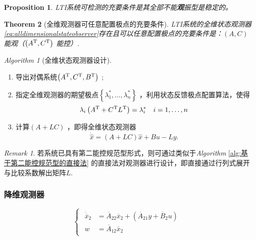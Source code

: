 \documentclass[14pt,a4paper]{article}
\theoremstyle{plain}
\newtheorem{thm}{Theorem}[section]
\theoremstyle{definition}
\theoremstyle{remark}
\newtheorem*{nnr}{Remark}
\theoremstyle{plain}
\theoremstyle{plain}
\theoremstyle{plain}
\newtheorem{prop}[thm]{Proposition}
\theoremstyle{definition}
\theoremstyle{remark}
\newtheorem{alg}{Algorithm}[section]
\numberwithin{equation}{section}
\begin{document}
				\begin{prop}  
				\label{prop:可检测性与可稳性的关系2}
					LTI系统可检测的充要条件是其全部不能\textbf{观}振型是稳定的。
				\end{prop} 

				\begin{thm}[全维观测器可任意配置极点的充要条件]  
				\label{the:全维观测器可任意配置极点的充要条件}
				LTI系统的全维状态观测器\eqref{eq:alldimensionalstateobserver}存在且可以任意配置极点的充要条件是：$\left( A,C \right)$ 能观（$\left( A^{\textnormal{T}},C^{\textnormal{T}} \right)$ 能控）. 
				\end{thm} 

				\begin{alg}[全维状态观测器设计]  
				\label{alg:全维状态观测器设计}
					\ 
					\begin{enumerate}
						\item 导出对偶系统$\left( A^{\textnormal{T}}, C^{\textnormal{T}}, B^{\textnormal{T}} \right)$ ; 
						\item 指定全维观测器的期望极点$\left\{ \lambda_1^*,\ldots ,\lambda_{n}^* \right\}$ ，利用状态反馈极点配置算法，使得
							\[
							\lambda_{i} \left( A^\textnormal{T} + C^{\textnormal{T}} L^\textnormal{T} \right)  = \lambda_{i}^* \quad i=1,\ldots ,n
							\]
						\item 计算$(A+LC)$ ，即得全维状态观测器
							\[
								\dot{\hat{x}} = (A+LC) \hat{x} + Bu - Ly
							.\] 
					\end{enumerate} 
				\end{alg} 

				\begin{nnr}  
					若系统已具有第二能控规范型形式，则可通过类似于\textit{Algorithm} \ref{alg:基于第二能控规范型的直接法} 的直接法对观测器进行设计，即直接通过行列式展开与比较系数解出矩阵$L$. 
				\end{nnr} 

			\subsubsection{降维观测器}%
			\label{ssub:降维观测器}
			
				\begin{equation}
				\label{eq:部分状态系统}
					\begin{cases}
						\begin{aligned}
							\dot{\overline{x}}_2 &= \overline{A}_{22}\overline{x}_2 + \left( \overline{A}_{21}y + \overline{B}_2 u \right) \\ 
							w &= \overline{A}_{12}\overline{x}_2
						\end{aligned}  
					\end{cases} 
				\end{equation}
\end{document}
